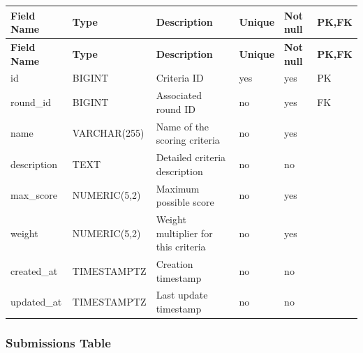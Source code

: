 \vspace{0.5em}
\renewcommand{\arraystretch}{1.15}
\setlength{\tabcolsep}{4pt}
\small
\begin{longtable}{|>{\raggedright\arraybackslash}p{}|>{\raggedright\arraybackslash}p{}|>{\raggedright\arraybackslash}p{}|>{\centering\arraybackslash}p{}|>{\centering\arraybackslash}p{}|>{\centering\arraybackslash}p{}|}
\hline
\textbf{Field Name} & \textbf{Type} & \textbf{Description} & \textbf{Unique} & \textbf{Not null} & \textbf{PK,FK} \\
\hline
\endfirsthead
\textbf{Field Name} & \textbf{Type} & \textbf{Description} & \textbf{Unique} & \textbf{Not null} & \textbf{PK,FK} \\
\hline
\endhead
id & BIGINT & Criteria ID & yes & yes & PK \\
\hline
round\_id & BIGINT & Associated round ID & no & yes & FK \\
\hline
name & VARCHAR(255) & Name of the scoring criteria & no & yes & \\
\hline
description & TEXT & Detailed criteria description & no & no & \\
\hline
max\_score & NUMERIC(5,2) & Maximum possible score & no & yes & \\
\hline
weight & NUMERIC(5,2) & Weight multiplier for this criteria & no & yes & \\
\hline
created\_at & TIMESTAMPTZ & Creation timestamp & no & no & \\
\hline
updated\_at & TIMESTAMPTZ & Last update timestamp & no & no & \\
\hline
\end{longtable}

\vspace{1em}
\subsubsection{Submissions Table}
\label{subsubsec:submissions-table}


